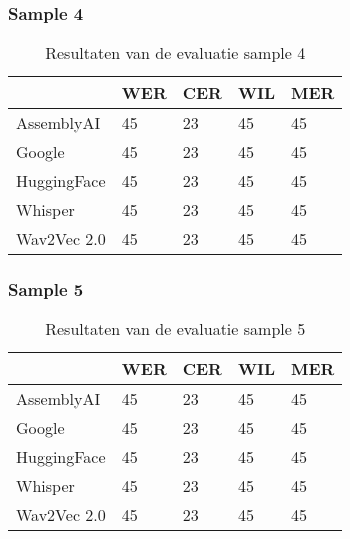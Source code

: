 \subsubsection{Sample 4}
\begin{table}[htbp]
    \centering
    \caption{Resultaten van de evaluatie sample 4}
    \label{tab:results_sample4}
    \begin{tabularx}{\textwidth}{|l|X|X|X|X|}
        \hline
        & \textbf{WER} & \textbf{CER} & \textbf{WIL} & \textbf{MER} \\ \hline
        AssemblyAI & 45 & 23 & 45 & 45 \\ \hline
        Google & 45 & 23 & 45 & 45 \\ \hline
        HuggingFace & 45 & 23 & 45 & 45 \\ \hline
        Whisper & 45 & 23 & 45 & 45 \\ \hline
        Wav2Vec 2.0 & 45 & 23 & 45 & 45 \\ \hline
    \end{tabularx}
\end{table}
\FloatBarrier


\subsubsection{Sample 5}
\begin{table}[htbp]
    \centering
    \caption{Resultaten van de evaluatie sample 5}
    \label{tab:results_sample5}
    \begin{tabularx}{\textwidth}{|l|X|X|X|X|}
        \hline
        & \textbf{WER} & \textbf{CER} & \textbf{WIL} & \textbf{MER} \\ \hline
        AssemblyAI & 45 & 23 & 45 & 45 \\ \hline
        Google & 45 & 23 & 45 & 45 \\ \hline
        HuggingFace & 45 & 23 & 45 & 45 \\ \hline
        Whisper & 45 & 23 & 45 & 45 \\ \hline
        Wav2Vec 2.0 & 45 & 23 & 45 & 45 \\ \hline
    \end{tabularx}
\end{table}
\FloatBarrier


